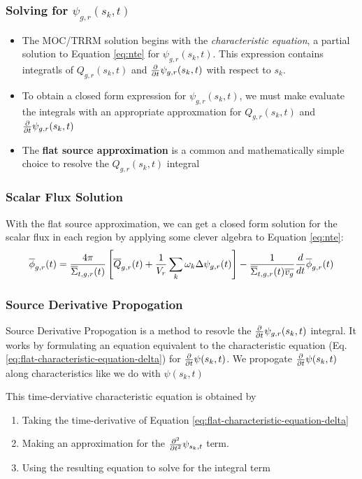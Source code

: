 \begin{frame}
  \frametitle{Solving for $\psi_{g,r}(s_{k},t)$}
    \begin{itemize}
        \item The MOC/TRRM solution begins with the {\it characteristic
            equation}, a partial solution to Equation \ref{eq:nte} for
            $\psi_{g,r}(s_{k},t)$. This
            expression contains integratls of $Q_{g,r}(s_{k},t)$ and
            $\frac{\partial}{\partial t} \psi_{g,r}(s_{k},t)$
            with respect to $s_{k}$.
        \item To obtain a closed form expression for $\psi_{g,r}(s_{k},t)$, we
            must make evaluate the integrals with an appropriate approxmation
            for $Q_{g,r}(s_{k},t)$ and $\frac{\partial}{\partial t} \psi_{g,r}(s_{k},t)$
        \item The {\bf flat source approximation} is a common and mathematically
            simple choice to resolve the $Q_{g,r}(s_{k},t)$ integral
    \end{itemize}
\end{frame}

\begin{frame}
  \frametitle{Scalar Flux Solution}
    With the flat source approximation, we can get a closed form solution for
    the scalar flux in each region by applying some clever algebra to Equation
    \ref{eq:nte}: 
    \begin{equation}
        \label{eq:scalar-flux-cell-averaged-flat}
        \overline{\phi}_{g,r}(t) = \frac{4\pi}{\overline{\Sigma}_{t,g,r}(t)} \left[\overline{Q}_{g,r}(t) +
        \frac{1}{V_r}\sum_k \omega_k \Delta \psi_{g,r}(t) \right] -
        \frac{1}{\overline{\Sigma}_{t,g,r}(t)\overline{v_g}} \frac{d}{d t} \overline{\phi}_{g,r}(t)
    \end{equation}
\end{frame}

\begin{frame}
  \frametitle{Source Derivative Propogation}
  Source Derivative Propogation \cite{hoffman_td_2013} is a method to resovle
  the $\frac{\partial}{\partial t} \psi_{g,r}(s_{k},t)$ integral. It works by formulating an
  equation equivalent to the characteristic equation
  (Eq. \ref{eq:flat-characteristic-equation-delta}) for $\frac{\partial}{\partial t}
  \psi(s_{k},t)$. We propogate $\frac{\partial}{\partial t} \psi(s_{k},t)$ along
  characteristics like we do with $\psi(s_{k},t)$

  This time-derviative characteristic equation is obtained by
  \begin{enumerate}
      \item Taking the time-derivative of Equation \ref{eq:flat-characteristic-equation-delta}
      \item Making an approximation for the $\frac{\partial^2}{\partial t^2} \psi_{s_{k},t}$ term.
      \item Using the resulting equation to solve for the integral term
  \end{enumerate}
\end{frame}


